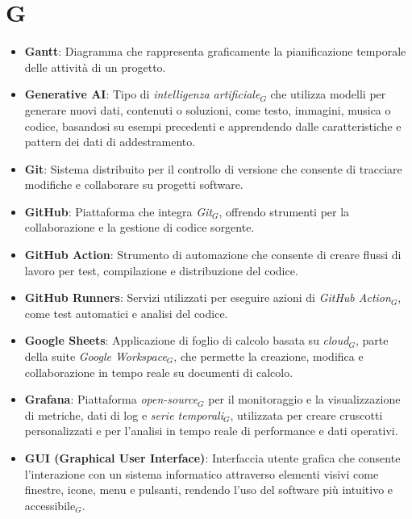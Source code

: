 \section{G}
\begin{itemize}
    \item \textbf{Gantt}: Diagramma che rappresenta graficamente la pianificazione temporale delle attività di un progetto.
    \item \textbf{Generative AI}: Tipo di \textit{intelligenza artificiale$_G$} che utilizza modelli per generare nuovi dati, contenuti o soluzioni, come testo, immagini, musica o codice, basandosi su esempi precedenti e apprendendo dalle caratteristiche e pattern dei dati di addestramento.
    \item \textbf{Git}: Sistema distribuito per il controllo di versione che consente di tracciare modifiche e collaborare su progetti software.
    \item \textbf{GitHub}: Piattaforma che integra \textit{Git}$_G$, offrendo strumenti per la collaborazione e la gestione di codice sorgente.
    \item \textbf{GitHub Action}: Strumento di automazione che consente di creare flussi di lavoro per test, compilazione e distribuzione del codice.
    \item \textbf{GitHub Runners}: Servizi utilizzati per eseguire azioni di \textit{GitHub Action}$_G$, come test automatici e analisi del codice.
    \item \textbf{Google Sheets}: Applicazione di foglio di calcolo basata su \textit{cloud}$_G$, parte della suite \textit{Google Workspace}$_G$, che permette la creazione, modifica e collaborazione in tempo reale su documenti di calcolo.
    \item \textbf{Grafana}: Piattaforma \textit{open-source}$_G$ per il monitoraggio e la visualizzazione di metriche, dati di log e \textit{serie temporali}$_G$, utilizzata per creare cruscotti personalizzati e per l'analisi in tempo reale di performance e dati operativi.
    \item \textbf{GUI (Graphical User Interface)}: Interfaccia utente grafica che consente l'interazione con un sistema informatico attraverso elementi visivi come finestre, icone, menu e pulsanti, rendendo l'uso del software più intuitivo e accessibile$_G$.

\end{itemize}
